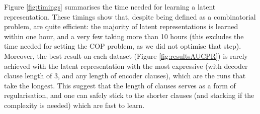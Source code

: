 Figure \ref{fig:timings} summarises the time needed for learning a  latent representation.
These timings show that, despite being defined as a combinatorial problem,  are quite efficient: the majority of latent representations is learned within one hour, and a very few taking more than 10 hours (this excludes the time needed for setting the COP problem, as we did not optimise that step).
Moreover, the best result on each dataset (Figure \ref{fig:resultsAUCPR}) is rarely achieved with the latent representation with the most expressive \alp{} (with decoder clause length of 3, and any length of encoder clauses), which are the runs that take the longest.
This suggest that the length of clauses serves as a form of regularisation, and one can safely stick to the shorter clauses (and stacking if the complexity is needed) which are fast to learn.



%
%
%
%
%









